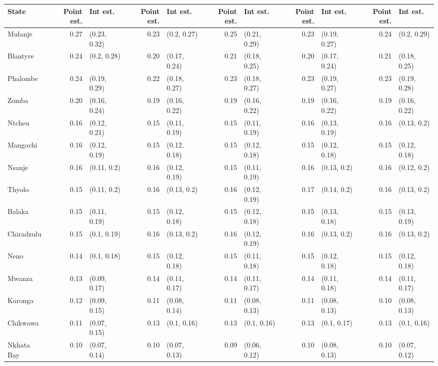 
\begin{tabular}{lrlrlrlrlrl}
\toprule
State & Point est. & Int est. & Point est. & Int est. & Point est. & Int est. & Point est. & Int est. & Point est. & Int est.\\
\midrule
Mulanje & 0.27 & (0.23, 0.32) & 0.23 & (0.2, 0.27) & 0.25 & (0.21, 0.29) & 0.23 & (0.19, 0.27) & 0.24 & (0.2, 0.29)\\
Blantyre & 0.24 & (0.2, 0.28) & 0.20 & (0.17, 0.24) & 0.21 & (0.18, 0.25) & 0.20 & (0.17, 0.24) & 0.21 & (0.18, 0.25)\\
Phalombe & 0.24 & (0.19, 0.29) & 0.22 & (0.18, 0.27) & 0.23 & (0.18, 0.27) & 0.23 & (0.19, 0.27) & 0.23 & (0.19, 0.28)\\
Zomba & 0.20 & (0.16, 0.24) & 0.19 & (0.16, 0.22) & 0.19 & (0.16, 0.22) & 0.19 & (0.16, 0.22) & 0.19 & (0.16, 0.22)\\
Ntcheu & 0.16 & (0.12, 0.21) & 0.15 & (0.11, 0.19) & 0.15 & (0.11, 0.19) & 0.16 & (0.13, 0.19) & 0.16 & (0.13, 0.2)\\
Mangochi & 0.16 & (0.12, 0.19) & 0.15 & (0.12, 0.18) & 0.15 & (0.12, 0.18) & 0.15 & (0.12, 0.18) & 0.15 & (0.12, 0.18)\\
Nsanje & 0.16 & (0.11, 0.2) & 0.16 & (0.12, 0.19) & 0.15 & (0.11, 0.19) & 0.16 & (0.13, 0.2) & 0.16 & (0.12, 0.2)\\
Thyolo & 0.15 & (0.11, 0.2) & 0.16 & (0.13, 0.2) & 0.16 & (0.12, 0.19) & 0.17 & (0.14, 0.2) & 0.16 & (0.13, 0.2)\\
Balaka & 0.15 & (0.11, 0.19) & 0.15 & (0.12, 0.18) & 0.15 & (0.12, 0.18) & 0.15 & (0.13, 0.18) & 0.15 & (0.13, 0.19)\\
Chiradzulu & 0.15 & (0.1, 0.19) & 0.16 & (0.13, 0.2) & 0.16 & (0.12, 0.19) & 0.16 & (0.13, 0.2) & 0.16 & (0.13, 0.2)\\
Neno & 0.14 & (0.1, 0.18) & 0.15 & (0.12, 0.18) & 0.15 & (0.11, 0.18) & 0.15 & (0.12, 0.18) & 0.15 & (0.12, 0.18)\\
Mwanza & 0.13 & (0.09, 0.17) & 0.14 & (0.11, 0.17) & 0.14 & (0.11, 0.17) & 0.14 & (0.11, 0.18) & 0.14 & (0.11, 0.17)\\
Karonga & 0.12 & (0.09, 0.15) & 0.11 & (0.08, 0.14) & 0.11 & (0.08, 0.13) & 0.11 & (0.08, 0.13) & 0.10 & (0.08, 0.13)\\
Chikwawa & 0.11 & (0.07, 0.15) & 0.13 & (0.1, 0.16) & 0.13 & (0.1, 0.16) & 0.13 & (0.1, 0.17) & 0.13 & (0.1, 0.16)\\
Nkhata Bay & 0.10 & (0.07, 0.14) & 0.10 & (0.07, 0.13) & 0.09 & (0.06, 0.12) & 0.10 & (0.08, 0.13) & 0.10 & (0.07, 0.12)\\

\end{tabular}
